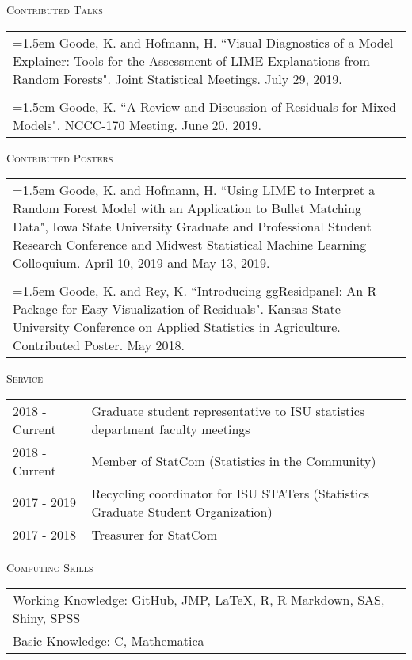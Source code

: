 \documentclass[10pt, oneside]{article}
\begin{document}
\noindent \textsc{Contributed Talks} \hrulefill
\begin{longtable}{p{16.5cm}}
\hangindent=1.5em Goode, K. and Hofmann, H. ``Visual Diagnostics of a Model Explainer: Tools for the Assessment of LIME Explanations from Random Forests". Joint Statistical Meetings. July 29, 2019.\\
\\
\hangindent=1.5em Goode, K. ``A Review and Discussion of Residuals for Mixed Models". NCCC-170 Meeting. June 20, 2019.
\end{longtable}

\noindent \textsc{Contributed Posters} \hrulefill
\begin{longtable}{p{16.5cm}}
\hangindent=1.5em Goode, K. and Hofmann, H. ``Using LIME to Interpret a Random Forest Model with an Application to Bullet Matching Data", Iowa State University Graduate and Professional Student Research Conference and Midwest Statistical Machine Learning Colloquium. April 10, 2019 and May 13, 2019.\\
\\ 
\hangindent=1.5em Goode, K. and Rey, K. ``Introducing ggResidpanel: An R Package for Easy Visualization of Residuals". Kansas State University Conference on Applied Statistics in Agriculture. Contributed Poster. May 2018.
\end{longtable}

\noindent \textsc{Service} \hrulefill
\begin{longtable}{p{2.5cm}p{14cm}}
\hfill{2018 - Current} & Graduate student representative to ISU statistics department faculty meetings\\
\hfill{2018 - Current} & Member of StatCom (Statistics in the Community)\\
\hfill{2017 - 2019} & Recycling coordinator for ISU STATers (Statistics Graduate Student Organization)\\
\hfill{2017 - 2018} & Treasurer for StatCom
\end{longtable}

\noindent \textsc{Computing Skills} \hrulefill
\begin{longtable}{p{16.5cm}}
Working Knowledge: GitHub, JMP, \LaTeX, R, R Markdown, SAS, Shiny, SPSS\\
Basic Knowledge: C, Mathematica
\end{longtable}
\end{document}
